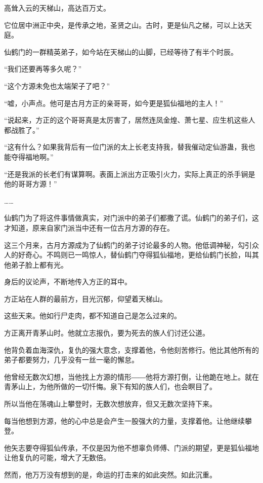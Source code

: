 
\begin{this_body}

高耸入云的天梯山，高达百万丈。

它位居中洲正中央，是传承之地，圣贤之山。古时，更是仙凡之梯，可以上达天庭。

仙鹤门的一群精英弟子，如今站在天梯山的山脚，已经等待了有半个时辰。

“我们还要再等多久呢？”

“这个方源未免也太端架子了吧？”

“嘘，小声点。他可是古月方正的亲哥哥，如今更是狐仙福地的主人！”

“说起来，方正的这个哥哥真是太厉害了，居然连凤金煌、萧七星、应生机这些人都战胜了。”

“这有什么？如果我背后有一位门派的太上长老支持我，替我催动定仙游蛊，我也能夺得福地啊。”

“还是我派的长老们有谋算啊。表面上派出方正吸引火力，实际上真正的杀手锏是他的哥哥方源！”

……

仙鹤门为了将这件事情做真实，对门派中的弟子们都撒了谎。仙鹤门的弟子们，这才知道，原来自家门派当中还有一位古月方源的存在。

这三个月来，古月方源成为了仙鹤门的弟子讨论最多的人物。他低调神秘，勾引众人的好奇心。不鸣则已一鸣惊人，替仙鹤门夺得狐仙福地，更给仙鹤门长脸，叫其他弟子脸上都有光。

身后的议论声，不断地传入方正的耳中。

方正站在人群的最前方，目光沉郁，仰望着天梯山。

这些天来。他如行尸走肉，都不知道自己是怎么过来的。

方正离开青茅山时。他就立志报仇，要为死去的族人们讨还公道。

他背负着血海深仇，复仇的强大意念，支撑着他，令他刻苦修行。他比其他所有的弟子都要努力，几乎没有一丝一毫的懈怠。

他曾经无数次幻想，当他找上方源的情形――他将方源打倒，让他跪在地上。就在青茅山上，为他所做的一切忏悔。泉下有知的族人们，也会瞑目了。

所以当他在荡魂山上攀登时，无数次想放弃，但又无数次坚持下来。

每当他想到方源，他的心中总是会产生一股强大的力量，支撑着他。让他继续攀登。

他矢志要夺得狐仙传承，不仅是因为他不想辜负师傅、门派的期望，更是狐仙福地让他复仇的可能，增大了无数倍。

然而，他万万没有想到的是，命运的打击来的如此突然。如此沉重。


\end{this_body}
